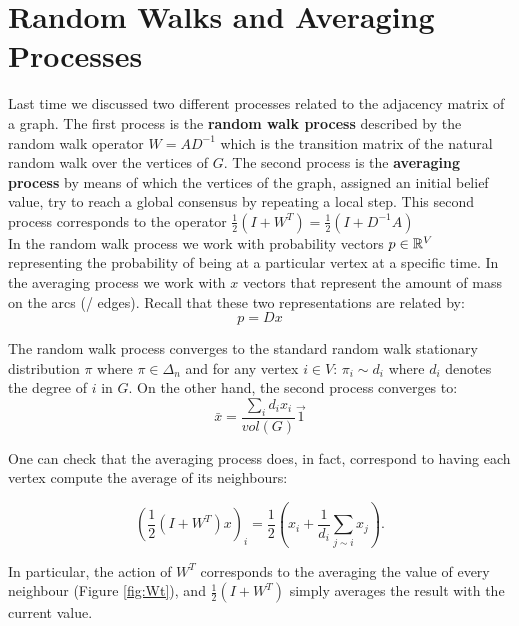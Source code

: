 \documentclass[11pt]{article}
\begin{document}

\section{Random Walks and Averaging Processes}
Last time we discussed two different processes related to the adjacency matrix of a graph. The first process is the \textbf{random walk process} described by the random walk operator $W = AD^{-1}$ which is the transition matrix of the natural random walk over the vertices of $G$. The second process is the \textbf{averaging process} by means of which the vertices of the graph, assigned an initial belief value, try to reach a global consensus by repeating a local step. This second process corresponds to the operator $\frac{1}{2}(I + W^T) = \frac{1}{2}(I+D^{-1}A)$\\

\noindent
In the random walk process we work with probability vectors $p \in \mathbb{R}^V$ representing the probability of being at a particular vertex at a specific time. In the averaging process we work with $x$ vectors that represent the amount of mass on the arcs (/ edges). Recall that these two representations are related by:
\begin{equation}\label{change_of_basis}
    \boxed{p = Dx}
\end{equation}

\noindent
The random walk process converges to the standard random walk stationary distribution $\pi$ where $\pi \in \Delta_n$ and for any vertex $i \in V$: $\pi_i \sim d_i$ where $d_i$ denotes the degree of $i$ in $G$. On the other hand, the second process converges to: 
\[
    \bar{x} = \frac{\sum_i d_i x_i}{vol(G)}\vec{1}
\]

\noindent
One can check that the averaging process does, in fact, correspond to having each vertex compute the average of its neighbours:

\[
    \left(\frac{1}{2}(I + W^T)x\right)_i = \frac{1}{2}\left(x_i + \frac{1}{d_i}\sum_{j \sim i} x_j\right).
\]

\noindent
In particular, the action of $W^T$ corresponds to the averaging the value of every neighbour (Figure \ref{fig:Wt}), and $\frac{1}{2}(I+W^T)$ simply averages the result with the current value.
\end{document}
